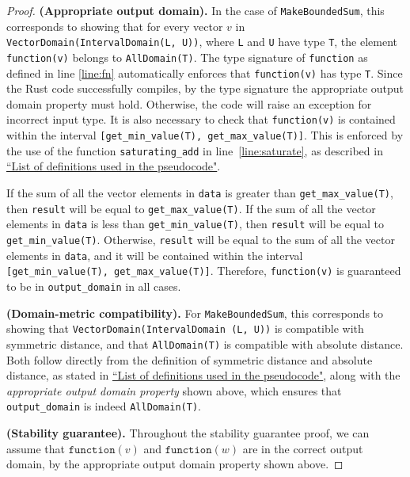 \documentclass[11pt,a4paper]{article}
\theoremstyle{definition}
\newcommand{\function}{\texttt{function}}
\begin{document}
\begin{proof}
    \textbf{(Appropriate output domain).} In the case of \texttt{MakeBoundedSum}, this corresponds to showing that for every vector $v$ in \texttt{VectorDomain(IntervalDomain(L, U))}, where \texttt{L} and \texttt{U} have type \texttt{T}, the element \texttt{function(v)} belongs to \texttt{AllDomain(T)}.
    The type signature of \texttt{function} as defined in line \ref{line:fn} automatically enforces that \texttt{function(v)} has type \texttt{T}. Since the Rust code successfully compiles, by the type signature the appropriate output domain property must hold. Otherwise, the code will raise an exception for incorrect input type. It is also necessary to check that \texttt{function(v)} is contained within the interval \texttt{[get\_min\_value(T), get\_max\_value(T)]}. This is enforced by the use of the function \texttt{saturating\_add} in line~\ref{line:saturate}, as described in \href{https://www.overleaf.com/project/60d215bf90b337ac02200a99}{``List of definitions used in the pseudocode"}.
    
    If the sum of all the vector elements in \texttt{data} is greater than \texttt{get\_max\_value(T)}, then \texttt{result} will be equal to \texttt{get\_max\_value(T)}. If the sum of all the vector elements in \texttt{data} is less than \texttt{get\_min\_value(T)}, then \texttt{result} will be equal to \texttt{get\_min\_value(T)}. Otherwise, \texttt{result} will be equal to the sum of all the vector elements in \texttt{data}, and it will be contained within the interval \texttt{[get\_min\_value(T), get\_max\_value(T)]}. Therefore, \texttt{function(v)} is guaranteed to be in \texttt{output\_domain} in all cases.
    
    \smallskip
    \textbf{(Domain-metric compatibility).} For \texttt{MakeBoundedSum}, this corresponds to showing that \texttt{VectorDomain(IntervalDomain (L, U))} is compatible with symmetric distance, and that \texttt{AllDomain(T)} is compatible with absolute distance. Both follow directly from the definition of symmetric distance and absolute distance, as stated in \href{https://www.overleaf.com/project/60d215bf90b337ac02200a99}{``List of definitions used in the pseudocode"}, along with the \textit{appropriate output domain property} shown above, which ensures that \texttt{output\_domain} is indeed \texttt{AllDomain(T)}.
    
    \smallskip
    \textbf{(Stability guarantee).} Throughout the stability guarantee proof, we can assume that $\function(v)$ and $\function(w)$ are in the correct output domain, by the appropriate output domain property shown above. 
    

\end{proof}
\end{document}
